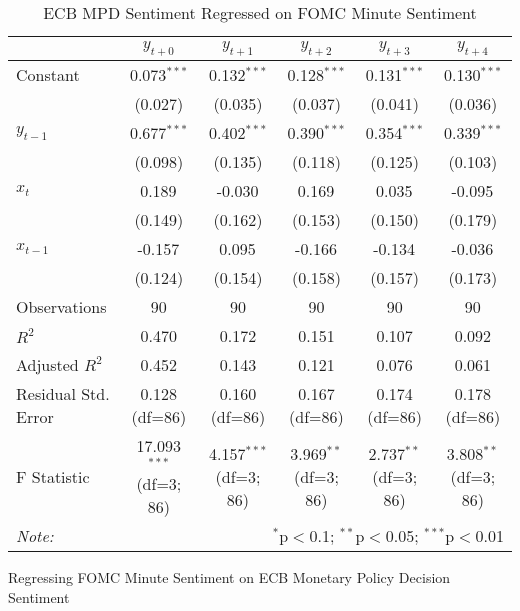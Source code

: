 \documentclass [12pt]{article}
\begin{document}
\begin{table}[H]
    \centering
    \caption{ECB MPD Sentiment Regressed on FOMC Minute Sentiment}
    \begin{adjustbox}{width=\textwidth}
    \begin{tabular}{lccccc}
    \hline
    \hline
     & \multicolumn{1}{c}{$y_{t+0}$} & \multicolumn{1}{c}{$y_{t+1}$} & \multicolumn{1}{c}{$y_{t+2}$} & \multicolumn{1}{c}{$y_{t+3}$} & \multicolumn{1}{c}{$y_{t+4}$}  \\
    \hline
     Constant & 0.073$^{***}$ & 0.132$^{***}$ & 0.128$^{***}$ & 0.131$^{***}$ & 0.130$^{***}$ \\
    & (0.027) & (0.035) & (0.037) & (0.041) & (0.036) \\
     $y_{t-1}$ & 0.677$^{***}$ & 0.402$^{***}$ & 0.390$^{***}$ & 0.354$^{***}$ & 0.339$^{***}$ \\
    & (0.098) & (0.135) & (0.118) & (0.125) & (0.103) \\
     $x_{t}$ & 0.189$^{}$ & -0.030$^{}$ & 0.169$^{}$ & 0.035$^{}$ & -0.095$^{}$ \\
    & (0.149) & (0.162) & (0.153) & (0.150) & (0.179) \\
     $x_{t-1}$ & -0.157$^{}$ & 0.095$^{}$ & -0.166$^{}$ & -0.134$^{}$ & -0.036$^{}$ \\
    & (0.124) & (0.154) & (0.158) & (0.157) & (0.173) \\
    \hline
     Observations & 90 & 90 & 90 & 90 & 90 \\
     $R^2$ & 0.470 & 0.172 & 0.151 & 0.107 & 0.092 \\
     Adjusted $R^2$ & 0.452 & 0.143 & 0.121 & 0.076 & 0.061 \\
     Residual Std. Error & 0.128 (df=86) & 0.160 (df=86) & 0.167 (df=86) & 0.174 (df=86) & 0.178 (df=86) \\
     F Statistic & 17.093$^{***}$ (df=3; 86) & 4.157$^{***}$ (df=3; 86) & 3.969$^{**}$ (df=3; 86) & 2.737$^{**}$ (df=3; 86) & 3.808$^{**}$ (df=3; 86) \\
    \hline
    \hline
    \textit{Note:} & \multicolumn{5}{r}{$^{*}$p$<$0.1; $^{**}$p$<$0.05; $^{***}$p$<$0.01} \\
    \end{tabular}
  \end{adjustbox}
\end{table}

Regressing FOMC Minute Sentiment on ECB Monetary Policy Decision Sentiment
\end{document}
